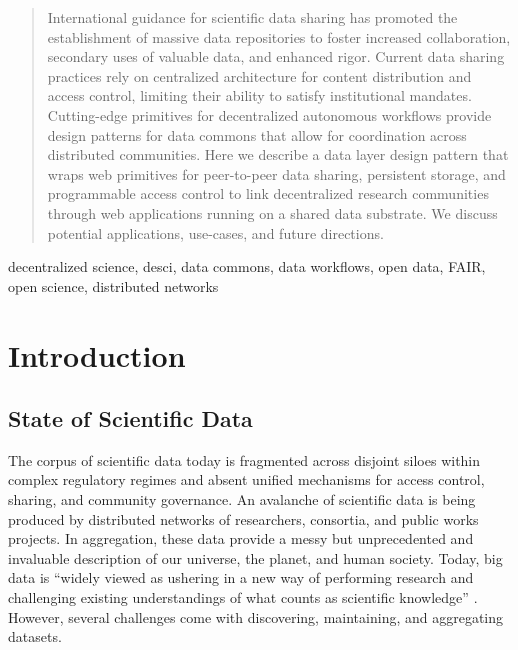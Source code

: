 \documentclass[conference]{IEEEtran}
\begin{document}
\maketitle

\begin{abstract}
 International guidance for scientific data sharing has promoted the establishment of massive data repositories to foster increased collaboration, secondary uses of valuable data, and enhanced rigor. Current data sharing practices rely on centralized architecture for content distribution and access control, limiting their ability to satisfy institutional mandates. Cutting-edge primitives for decentralized autonomous workflows provide design patterns for data commons that allow for coordination across distributed communities. Here we describe a data layer design pattern that wraps web primitives for peer-to-peer data sharing, persistent storage, and programmable access control to link decentralized research communities through web applications running on a shared data substrate. We discuss potential applications, use-cases, and future directions.
\end{abstract}

\begin{IEEEkeywords}
decentralized science, desci, data commons, data workflows, open data, FAIR, open science, distributed networks
\end{IEEEkeywords}

\section{Introduction}
\subsection{State of Scientific Data}
The corpus of scientific data today is fragmented across disjoint siloes within complex regulatory regimes and absent unified mechanisms for access control, sharing, and community governance. An avalanche of scientific data is being produced by distributed networks of researchers, consortia, and public works projects. In aggregation, these data provide a messy but unprecedented and invaluable description of our universe, the planet, and human society. Today, big data is “widely viewed as ushering in a new way of performing research and challenging existing understandings of what counts as scientific knowledge” \cite{sep-science-big-data}. However, several challenges come with discovering, maintaining, and aggregating datasets. 
\end{document}
